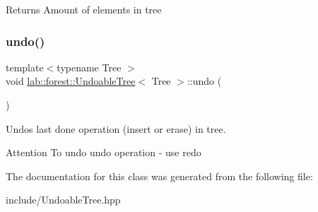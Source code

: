 \begin{DoxyReturn}{Returns}
Amount of elements in tree 
\end{DoxyReturn}
\mbox{\label{classlab_1_1forest_1_1UndoableTree_a4f19003d8156b047de5ff2869d5ac316}} 
\subsubsection{\texorpdfstring{undo()}{undo()}}
{\footnotesize\ttfamily template$<$typename Tree $>$ \\
void \hyperlink{classlab_1_1forest_1_1UndoableTree}{lab\+::forest\+::\+Undoable\+Tree}$<$ Tree $>$\+::undo (\begin{DoxyParamCaption}{ }\end{DoxyParamCaption})}



Undos last done operation (insert or erase) in tree. 

\begin{DoxyAttention}{Attention}
To undo undo operation -\/ use redo 
\end{DoxyAttention}


The documentation for this class was generated from the following file\+:\begin{DoxyCompactItemize}
\item 
include/Undoable\+Tree.\+hpp\end{DoxyCompactItemize}
